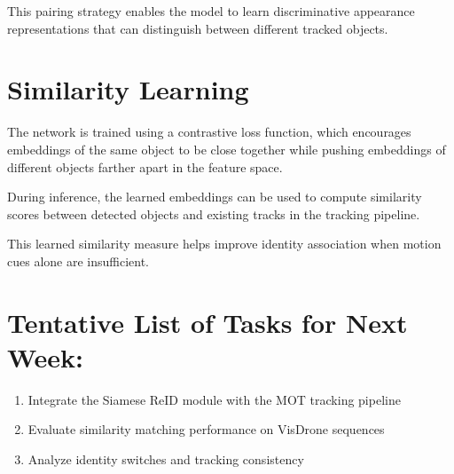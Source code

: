 \documentclass[11pt,a4paper]{article}
\begin{document}
	This pairing strategy enables the model to learn discriminative appearance representations that can distinguish between different tracked objects.
	
	\section*{Similarity Learning}
	
	The network is trained using a contrastive loss function, which encourages embeddings of the same object to be close together while pushing embeddings of different objects farther apart in the feature space.
	
	During inference, the learned embeddings can be used to compute similarity scores between detected objects and existing tracks in the tracking pipeline.
	
	This learned similarity measure helps improve identity association when motion cues alone are insufficient.
	
	\section*{Tentative List of Tasks for Next Week:}
	
	\begin{enumerate}
		\item Integrate the Siamese ReID module with the MOT tracking pipeline
		\item Evaluate similarity matching performance on VisDrone sequences
		\item Analyze identity switches and tracking consistency
	\end{enumerate}
	
\end{document}

